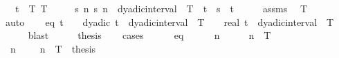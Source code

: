 \begin{isabellebody}
\ \ \ {\isachardoublequoteopen}t\ {\isasymin}\ {\isacharbraceleft}{\kern0pt}{}{\isachardot}{\kern0pt}{\isachardot}{\kern0pt}T{\isacharbraceright}{\kern0pt}{\isachardoublequoteclose}\ {\isachardoublequoteopen}T\ {\isasymnoteq}\ {}{\isachardoublequoteclose}\isanewline
\ \ \ {\isachardoublequoteopen}{\isasymexists}s{\isachardot}{\kern0pt}\ {\isasymforall}n{\isachardot}{\kern0pt}\ s\ n\ {\isasymin}\ dyadic{\isacharunderscore}{\kern0pt}interval\ {}\ T\ {\isacharminus}{\kern0pt}\ {\isacharbraceleft}{\kern0pt}t{\isacharbraceright}{\kern0pt}\ {\isasymand}\ s\ {\isasymlonglonglongrightarrow}\ t{\isachardoublequoteclose}\isanewline
%
\isadelimproof
%
\endisadelimproof
%
\isatagproof
{}\isamarkupfalse%
\ {\isacharminus}{\kern0pt}\isanewline
\ \ \isamarkupfalse%
\ assms\ \isamarkupfalse%
\ {\isachardoublequoteopen}T\ {\isachargreater}{\kern0pt}\ {}{\isachardoublequoteclose}\isanewline
\ \ \ \ \isamarkupfalse%
\ auto\isanewline
\ \ \isamarkupfalse%
\ {\isacharparenleft}{\kern0pt}eq{\isacharunderscore}{\kern0pt}{}{\isacharparenright}{\kern0pt}\ {\isachardoublequoteopen}t\ {\isacharequal}{\kern0pt}\ {}{\isachardoublequoteclose}\ {\isacharbar}{\kern0pt}\ {\isacharparenleft}{\kern0pt}dyadic{\isacharparenright}{\kern0pt}\ {\isachardoublequoteopen}t\ {\isasymin}\ dyadic{\isacharunderscore}{\kern0pt}interval\ {}\ T\ {\isacharminus}{\kern0pt}\ {\isacharbraceleft}{\kern0pt}{}{\isacharbraceright}{\kern0pt}{\isachardoublequoteclose}\ {\isacharbar}{\kern0pt}\ {\isacharparenleft}{\kern0pt}real{\isacharparenright}{\kern0pt}\ {\isachardoublequoteopen}t\ {\isasymnotin}\ dyadic{\isacharunderscore}{\kern0pt}interval\ {}\ T{\isachardoublequoteclose}\isanewline
\ \ \ \ \isamarkupfalse%
\ blast\isanewline
\ \ \isamarkupfalse%
\ \isamarkupfalse%
\ {\isacharquery}{\kern0pt}thesis\isanewline
\ \ \isamarkupfalse%
\ cases\isanewline
\ \ \ \ \isamarkupfalse%
\ eq{\isacharunderscore}{\kern0pt}{}\isanewline
\ \ \ \ \isamarkupfalse%
\ n\ \ {\isachardoublequoteopen}{}\ {\isasymle}\ {}\ {\isacharcircum}{\kern0pt}\ n\ {\isacharasterisk}{\kern0pt}\ T{\isachardoublequoteclose}\isanewline
\ \ \ \ \isamarkupfalse%
\ {\isacharminus}{\kern0pt}\isanewline
\ \ \ \ \ \ \isamarkupfalse%
\ {\isacharasterisk}{\kern0pt}{\isacharcolon}{\kern0pt}\ {\isachardoublequoteopen}{\isasymAnd}n{\isachardot}{\kern0pt}\ {}\ {\isasymle}\ {}\ {\isacharcircum}{\kern0pt}\ n\ {\isacharasterisk}{\kern0pt}\ T\ {\isasymLongrightarrow}\ thesis{\isachardoublequoteclose}\isanewline

\end{isabellebody}
